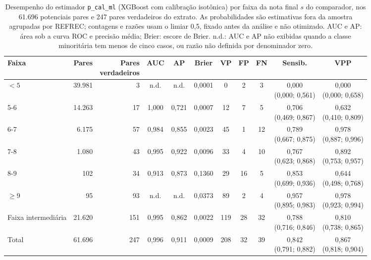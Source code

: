 \begin{table}[!htbp]
\centering
\scriptsize
\setlength{\tabcolsep}{3pt}
\caption{Desempenho do estimador \texttt{p\_cal\_ml} (XGBoost com calibração isotônica) por faixa da nota final $s$ do comparador, nos 61.696 potenciais pares e 247 pares verdadeiros do extrato. As probabilidades são estimativas fora da amostra agrupadas por REFREC; contagens e razões usam o limiar 0,5, fixado antes da análise e não otimizado. AUC e AP: área sob a curva ROC e precisão média; Brier: escore de Brier. n.d.: AUC e AP não exibidas quando a classe minoritária tem menos de cinco casos, ou razão não definida por denominador zero.}
\label{tab:e4-desempenho-faixas-oof}
\begin{tabular}{@{}lrrcccccccc@{}}
\toprule
Faixa & Pares & \shortstack{Pares\\verdadeiros} & AUC & AP & Brier & VP & FP & FN & Sensib. & VPP \\
\midrule
$<5$ & 39.981 & 3 & n.d. & n.d. & 0,0001 & 0 & 2 & 3 & \shortstack{0,000\\(0,000; 0,561)} & \shortstack{0,000\\(0,000; 0,658)} \\
5-6 & 14.263 & 17 & 1,000 & 0,721 & 0,0007 & 12 & 7 & 5 & \shortstack{0,706\\(0,469; 0,867)} & \shortstack{0,632\\(0,410; 0,809)} \\
6-7 & 6.175 & 57 & 0,984 & 0,855 & 0,0023 & 45 & 1 & 12 & \shortstack{0,789\\(0,667; 0,875)} & \shortstack{0,978\\(0,887; 0,996)} \\
7-8 & 1.080 & 43 & 0,995 & 0,922 & 0,0096 & 33 & 4 & 10 & \shortstack{0,767\\(0,623; 0,868)} & \shortstack{0,892\\(0,753; 0,957)} \\
8-9 & 102 & 34 & 0,913 & 0,873 & 0,1360 & 29 & 16 & 5 & \shortstack{0,853\\(0,699; 0,936)} & \shortstack{0,644\\(0,498; 0,768)} \\
$\geq9$ & 95 & 93 & n.d. & n.d. & 0,0373 & 89 & 2 & 4 & \shortstack{0,957\\(0,895; 0,983)} & \shortstack{0,978\\(0,923; 0,994)} \\
\midrule
Faixa intermediária & 21.620 & 151 & 0,995 & 0,862 & 0,0022 & 119 & 28 & 32 & \shortstack{0,788\\(0,716; 0,846)} & \shortstack{0,810\\(0,738; 0,865)} \\
Total & 61.696 & 247 & 0,996 & 0,911 & 0,0009 & 208 & 32 & 39 & \shortstack{0,842\\(0,791; 0,882)} & \shortstack{0,867\\(0,818; 0,904)} \\
\bottomrule
\end{tabular}


\end{table}
